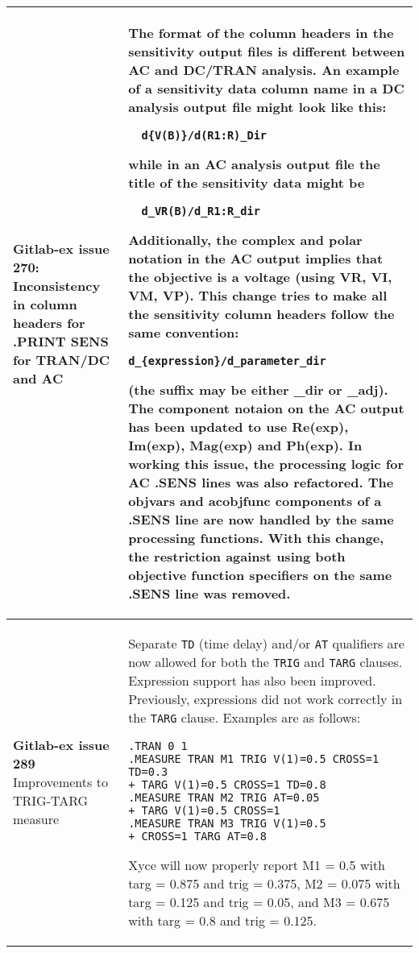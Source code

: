 {\begin{longtable}[h] {>{\raggedright\small}m{2in}|>{\raggedright\let\\\tabularnewline\small}m{3.5in}}
 \textbf{Gitlab-ex issue 270}: Inconsistency in column headers for .PRINT SENS for TRAN/DC and AC &
  The format of the column headers in the sensitivity output files is different
  between AC and DC/TRAN analysis. An example of a sensitivity data column name
  in a DC analysis output file might look like this:\begin{verbatim}
  d{V(B)}/d(R1:R)_Dir\end{verbatim}
  while in an AC analysis output file the title of the sensitivity data might be
  \begin{verbatim}
  d_VR(B)/d_R1:R_dir\end{verbatim}
  Additionally, the complex and polar notation in the AC output implies that the
  objective is a voltage (using VR, VI, VM, VP). This change tries to make all
  the sensitivity column headers follow the same convention:
  \begin{verbatim}d_{expression}/d_parameter_dir\end{verbatim}
  (the suffix may be either {\_}dir or {\_}adj). The component notaion on the AC
  output has been updated to use Re({exp}), Im({exp}), Mag({exp}) and Ph({exp}).
  In working this issue, the processing logic for AC .SENS lines was also
  refactored. The objvars and acobjfunc components of a .SENS line are now
  handled by the same processing functions. With this change, the restriction
  against using both objective function specifiers on the same .SENS line was
  removed. \\ \hline

\textbf{Gitlab-ex issue 289} Improvements to TRIG-TARG measure &
Separate \texttt{TD} (time delay) and/or \texttt{AT} qualifiers
are now allowed for both the \texttt{TRIG} and \texttt{TARG}
clauses.  Expression support has also been improved.  Previously,
expressions did not work correctly in the \texttt{TARG} clause.
Examples are as follows:

\begin{verbatim}
.TRAN 0 1
.MEASURE TRAN M1 TRIG V(1)=0.5 CROSS=1 TD=0.3
+ TARG V(1)=0.5 CROSS=1 TD=0.8
.MEASURE TRAN M2 TRIG AT=0.05
+ TARG V(1)=0.5 CROSS=1
.MEASURE TRAN M3 TRIG V(1)=0.5
+ CROSS=1 TARG AT=0.8
\end{verbatim}

Xyce will now properly report M1 = 0.5 with targ = 0.875 and
trig = 0.375, M2 = 0.075 with targ = 0.125 and trig = 0.05, and
M3 = 0.675 with targ = 0.8 and trig = 0.125.
\\ \hline


\end{longtable}}

